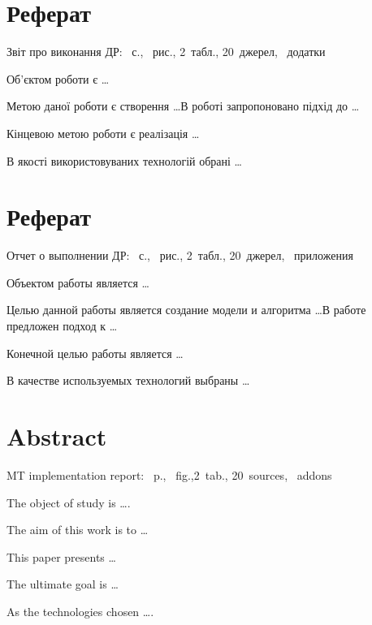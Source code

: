 \section*{Реферат}
{
\skipline
{Звіт про виконання ДР:}
{~с., ~рис., 2~табл.,
20~джерел, ~додатки}\skipline %

\skipline

Об'єктом роботи є \ldots

Метою даної роботи є створення \ldots В роботі запропоновано підхід до \ldots

Кінцевою метою роботи є реалізація \ldots

В якості використовуваних технологій обрані \ldots

}
\section*{Реферат}
{
\skipline
{Отчет о выполнении ДР:}
{~с., ~рис., 2~табл.,
20~джерел, ~приложения}\skipline

\skipline

Объектом работы является \ldots

Целью данной работы является создание модели и алгоритма \ldots В работе предложен
подход к \ldots

Конечной целью работы является \ldots

В качестве используемых технологий выбраны \ldots
}

\section*{Abstract}
{
\skipline
{MT implementation report: }
{~p., ~fig.,2~tab.,
20~sources, ~addons}\skipline

\skipline

The object of study is \ldots.

The aim of this work is to \ldots

This paper presents \ldots

The ultimate goal is \ldots

As the technologies chosen \ldots.
}
